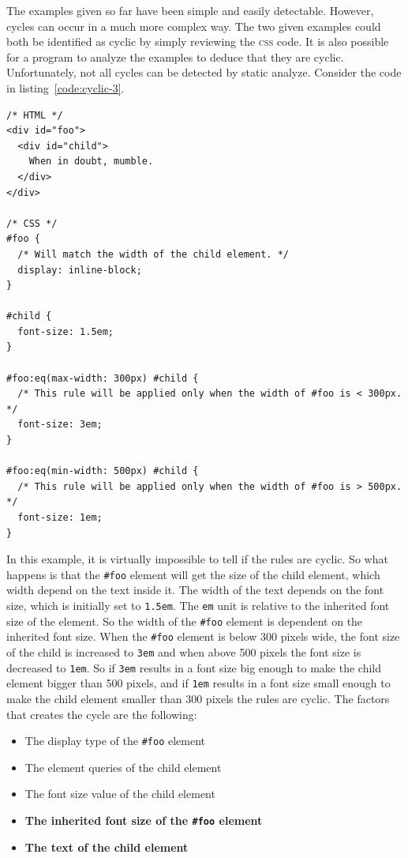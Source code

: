\documentclass[a4paper,11pt]{kth-mag}
\newcommand{\code}[1]{\texttt{#1}}
\begin{document}
          The examples given so far have been simple and easily detectable.
          However, cycles can occur in a much more complex way.
          The two given examples could both be identified as cyclic by simply reviewing the \textsc{css} code.
          It is also possible for a program to analyze the examples to deduce that they are cyclic.
          Unfortunately, not all cycles can be detected by static analyze.
          Consider the code in listing~\ref{code:cyclic-3}.
          \begin{lstlisting}[caption={Example of indirect cyclic rules.}, captionpos=b, label={code:cyclic-3}]
/* HTML */
<div id="foo">
  <div id="child">
    When in doubt, mumble.
  </div>
</div>

/* CSS */
#foo {
  /* Will match the width of the child element. */
  display: inline-block;
}

#child {
  font-size: 1.5em;
}

#foo:eq(max-width: 300px) #child {
  /* This rule will be applied only when the width of #foo is < 300px. */
  font-size: 3em;
}

#foo:eq(min-width: 500px) #child { 
  /* This rule will be applied only when the width of #foo is > 500px. */
  font-size: 1em;
}
          \end{lstlisting}
          In this example, it is virtually impossible to tell if the rules are cyclic.
          So what happens is that the \code{\#foo} element will get the size of the child element, which width depend on the text inside it.
          The width of the text depends on the font size, which is initially set to \code{1.5em}.
          The \code{em} unit is relative to the inherited font size of the element.
          So the width of the \code{\#foo} element is dependent on the inherited font size.
          When the \code{\#foo} element is below 300 pixels wide, the font size of the child is increased to \code{3em} and when above 500 pixels the font size is decreased to \code{1em}.
          So if \code{3em} results in a font size big enough to make the child element bigger than 500 pixels, and if \code{1em} results in a font size small enough to make the child element smaller than 300 pixels the rules are cyclic.
          The factors that creates the cycle are the following:
          \begin{itemize}
            \item The display type of the \code{\#foo} element
            \item The element queries of the child element
            \item The font size value of the child element
            \item \textbf{The inherited font size of the \code{\#foo} element}
            \item \textbf{The text of the child element}
          \end{itemize}
\end{document}
